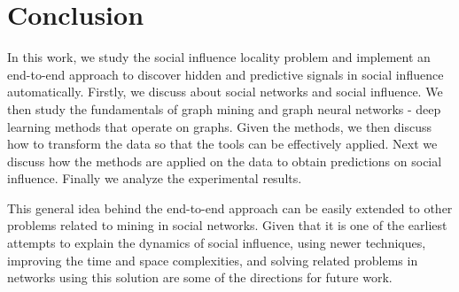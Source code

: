 \chapter{Conclusion}

In this work, we study the social influence locality problem and implement an end-to-end approach to discover hidden and predictive signals in social influence automatically. Firstly, we discuss about social networks and social influence. We then study the 
fundamentals of graph mining and graph neural networks - deep learning methods that operate on graphs.  Given the methods, we then discuss how to transform the data so that the tools can be effectively applied.
Next we discuss how the methods are applied on the data to obtain predictions on social influence. Finally we analyze the experimental results.

This general idea behind the end-to-end approach can be easily extended to other problems related to mining in social networks. Given that it is one of the 
earliest attempts to explain the dynamics of social influence, using newer techniques, improving the time and space complexities, and solving related problems in networks using this solution are some of the directions for future work.
